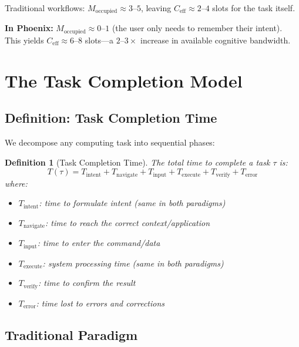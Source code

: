 \documentclass[11pt, a4paper]{article}
\newtheorem{definition}{Definition}
\begin{document}
Traditional workflows: $M_{\text{occupied}} \approx 3\text{--}5$, leaving
$C_{\text{eff}} \approx 2\text{--}4$ slots for the task itself.

\textbf{In Phoenix:} $M_{\text{occupied}} \approx 0\text{--}1$ (the user only needs
to remember their intent). This yields $C_{\text{eff}} \approx 6\text{--}8$
slots---a $2\text{--}3\times$ increase in available cognitive bandwidth.

\section{The Task Completion Model}

\subsection{Definition: Task Completion Time}

We decompose any computing task into sequential phases:

\begin{definition}[Task Completion Time]
The total time to complete a task $\tau$ is:
\begin{equation}
  T(\tau) = T_{\text{intent}} + T_{\text{navigate}} + T_{\text{input}} + T_{\text{execute}} + T_{\text{verify}} + T_{\text{error}}
  \label{eq:task}
\end{equation}
where:
\begin{itemize}[noitemsep]
  \item $T_{\text{intent}}$: time to formulate intent (same in both paradigms)
  \item $T_{\text{navigate}}$: time to reach the correct context/application
  \item $T_{\text{input}}$: time to enter the command/data
  \item $T_{\text{execute}}$: system processing time (same in both paradigms)
  \item $T_{\text{verify}}$: time to confirm the result
  \item $T_{\text{error}}$: time lost to errors and corrections
\end{itemize}
\end{definition}

\subsection{Traditional Paradigm}
\end{document}
